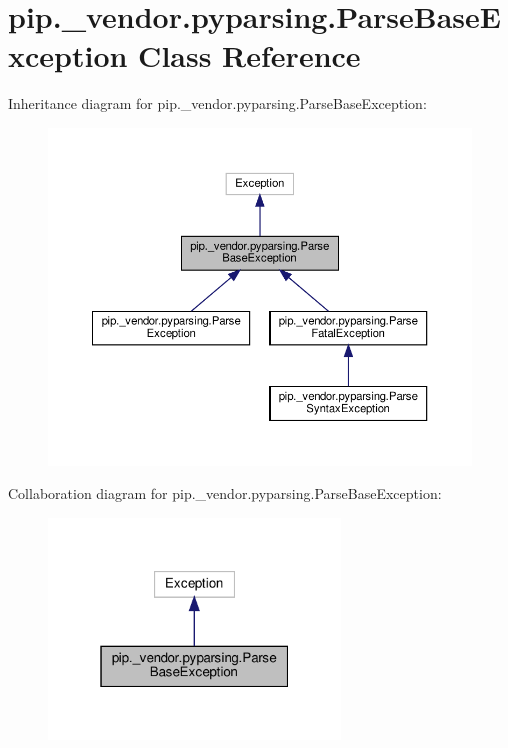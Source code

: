 \hypertarget{classpip_1_1__vendor_1_1pyparsing_1_1ParseBaseException}{}\section{pip.\+\_\+vendor.\+pyparsing.\+Parse\+Base\+Exception Class Reference}
\label{classpip_1_1__vendor_1_1pyparsing_1_1ParseBaseException}


Inheritance diagram for pip.\+\_\+vendor.\+pyparsing.\+Parse\+Base\+Exception\+:
\nopagebreak
\begin{figure}[H]
\begin{center}
\leavevmode
\includegraphics[width=350pt]{classpip_1_1__vendor_1_1pyparsing_1_1ParseBaseException__inherit__graph}
\end{center}
\end{figure}


Collaboration diagram for pip.\+\_\+vendor.\+pyparsing.\+Parse\+Base\+Exception\+:
\nopagebreak
\begin{figure}[H]
\begin{center}
\leavevmode
\includegraphics[width=220pt]{classpip_1_1__vendor_1_1pyparsing_1_1ParseBaseException__coll__graph}
\end{center}
\end{figure}
